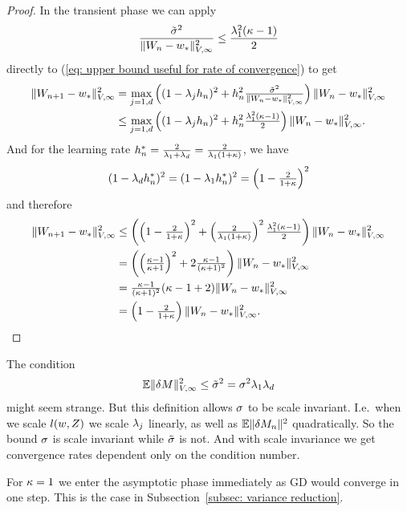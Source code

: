 \begin{proof}
	In the transient phase we can apply
	\begin{align*}
		\frac{\tilde{\sigma}^2}{
			\|W_n-w_*\|_{V,\infty}^2
		}
		\le \frac{\lambda_1^2(\kappa-1)}{2}
	\end{align*}
	directly to (\ref{eq: upper bound useful for rate of convergence}) to get
	\begin{align*}
		\|W_{n+1}-w_*\|_{V,\infty}^2
		&= \max_{j=1,d}\left((1- \lambda_jh_n)^2
			+h_n^2\tfrac{\tilde{\sigma}^2}{\|W_n-w_*\|_{V,\infty}^2}
		\right)\|W_n-w_*\|_{V,\infty}^2\\
		&\le \max_{j=1,d}\left((1- \lambda_jh_n)^2
			+h_n^2\tfrac{\lambda_1^2(\kappa-1)}{2}
		\right)\|W_n-w_*\|_{V,\infty}^2.
	\end{align*}
	And for the learning rate
	\(h_n^*=\tfrac{2}{\lambda_1+\lambda_d}
	=\tfrac{2}{\lambda_1(1+\kappa)}\),
	we have
	\begin{align*}
		(1-\lambda_dh_n^*)^2
		= (1-\lambda_1h_n^*)^2
		= \left(1-\tfrac{2}{1+\kappa}\right)^2
	\end{align*}
	and therefore
	\begin{align*}
		\|W_{n+1}-w_*\|_{V,\infty}^2
		&\le \left(\left(1-\tfrac{2}{1+\kappa}\right)^2
			+\left(\tfrac{2}{\lambda_1(1+\kappa)}\right)^2\tfrac{\lambda_1^2(\kappa-1)}{2}
		\right)\|W_n-w_*\|_{V,\infty}^2\\
		&=\left(
			\left(\tfrac{\kappa-1}{\kappa+1}\right)^2 + 2 \tfrac{\kappa-1}{(\kappa+1)^2}
		\right)\|W_n-w_*\|_{V,\infty}^2\\
		&= \tfrac{\kappa-1}{(\kappa+1)^2}(\kappa-1 + 2)\|W_n-w_*\|_{V,\infty}^2\\
		&= \left(1-\tfrac{2}{1+\kappa}\right)\|W_n - w_*\|_{V,\infty}^2.
		\qedhere
	\end{align*}
\end{proof}
\begin{remark}
	The condition
	\begin{align*}
		\mathbb{E}\|\delta M\|_{V,\infty}^2
		\le \tilde{\sigma}^2 = \sigma^2 \lambda_1\lambda_d
	\end{align*}
	might seem strange. But this definition allows \(\sigma\) to be scale
	invariant. I.e.\ when we scale \(l(w, Z)\) we scale \(\lambda_j\)
	linearly, as well as \(\mathbb{E}\|\delta M_n\|^2\) quadratically. So the
	bound \(\sigma\) is scale invariant while \(\tilde{\sigma}\) is not.
	And with scale invariance we get convergence rates dependent only on the
	condition number.
\end{remark}
\begin{remark}
	For \(\kappa=1\) we enter the asymptotic phase immediately as GD would
	converge in one step. This is the case in Subsection~\ref{subsec:
	variance reduction}.
\end{remark}

